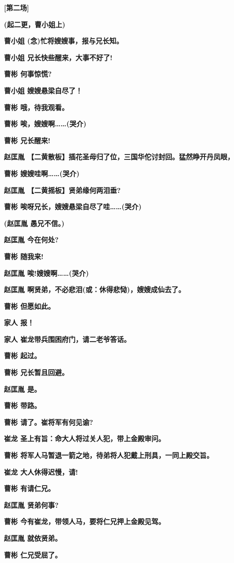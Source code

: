 \textbf{{[}第二场{]}}

\textbf{(起二更，曹小姐上)}

\textbf{曹小姐 (念)忙将嫂嫂事，报与兄长知。}

\textbf{曹小姐 兄长快些醒来，大事不好了!}

\textbf{曹彬 何事惊慌?}

\textbf{曹小姐 嫂嫂悬梁自尽了！}

\textbf{曹彬 哦，待我观看。}

\textbf{曹彬 唉，嫂嫂啊\ldots{}\ldots{}(哭介)}

\textbf{曹彬 兄长醒来!}

\textbf{赵匡胤
【二黄散板】插花圣母归了位，三国华佗讨封回。猛然睁开丹凤眼，}

\textbf{曹彬 嫂嫂哇啊\ldots{}\ldots{}(哭介)}

\textbf{赵匡胤 【二黄摇板】贤弟缘何两泪垂?}

\textbf{曹彬 唉呀兄长，嫂嫂悬梁自尽了哇\ldots{}\ldots{}(哭介)}

\textbf{(赵匡胤 愚兄不信。)}

\textbf{赵匡胤 今在何处?}

\textbf{曹彬 随我来!}

\textbf{赵匡胤 唉!嫂嫂啊\ldots{}\ldots{}(哭介)}

\textbf{赵匡胤 啊贤弟，不必悲泪(或：休得悲恸)，嫂嫂成仙去了。}

\textbf{曹彬 但愿如此。}

\textbf{家人 报！}

\textbf{家人 崔龙带兵围困府门，请二老爷答话。}

\textbf{曹彬 起过。}

\textbf{曹彬 兄长暂且回避。}

\textbf{赵匡胤 是。}

\textbf{曹彬 带路。}

\textbf{曹彬 请了。崔将军有何见谕?}

\textbf{崔龙 圣上有旨：命大人将过关人犯，带上金殿审问。}

\textbf{曹彬 将军人马暂退一箭之地，待弟将人犯戴上刑具，一同上殿交旨。}

\textbf{崔龙 大人休得迟慢，请!}

\textbf{曹彬 有请仁兄。}

\textbf{赵匡胤 贤弟何事?}

\textbf{曹彬 今有崔龙，带领人马，要将仁兄押上金殿见驾。}

\textbf{赵匡胤 就依贤弟。}

\textbf{曹彬 仁兄受屈了。}

